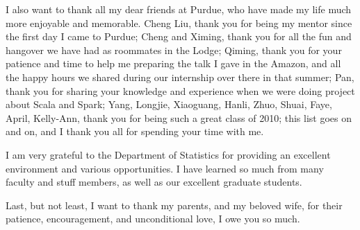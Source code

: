 \begin{acknowledgments}
  I also want to thank all my dear friends at Purdue, who have made my life much more
  enjoyable and memorable. Cheng Liu, thank you for being my mentor since the first day I
  came to Purdue; Cheng and Ximing, thank you for all the fun and hangover we have
  had as roommates in the Lodge; Qiming, thank you for your patience and time to help me 
  preparing the talk I gave in the Amazon, and all the happy hours we shared during our
  internship over there in that summer; Pan, thank you for sharing your knowledge and 
  experience when we were doing project about Scala and Spark; 
  Yang, Longjie, Xiaoguang, Hanli, Zhuo, Shuai, Faye, April, Kelly-Ann, thank you for
  being such a great class of 2010; this list goes on and on, and I thank you all for
  spending your time with me.

  I am very grateful to the Department of Statistics for providing an excellent 
  environment and various opportunities. I have learned so much from many faculty and
  stuff members, as well as our excellent graduate students.

  Last, but not least, I want to thank my parents, and my beloved wife, for
  their patience, encouragement, and unconditional love, I owe you so much.
\end{acknowledgments}


\tableofcontents

\listoftables

